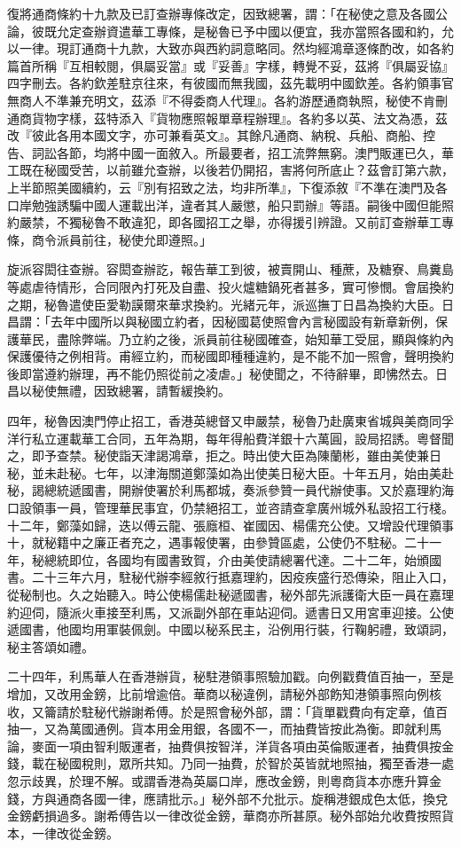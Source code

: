 \begin{pinyinscope}
復將通商條約十九款及已訂查辦專條改定，因致總署，謂：「在秘使之意及各國公論，彼既允定查辦資遣華工專條，是秘魯已予中國以便宜，我亦當照各國和約，允以一律。現訂通商十九款，大致亦與西約詞意略同。然均經鴻章逐條酌改，如各約篇首所稱『互相較閱，俱屬妥當』或『妥善』字樣，轉覺不妥，茲將『俱屬妥協』四字刪去。各約欽差駐京往來，有彼國而無我國，茲先載明中國欽差。各約領事官無商人不準兼充明文，茲添『不得委商人代理』。各約游歷通商執照，秘使不肯刪通商貨物字樣，茲特添入『貨物應照報單章程辦理』。各約多以英、法文為憑，茲改『彼此各用本國文字，亦可兼看英文』。其餘凡通商、納稅、兵船、商船、控告、詞訟各節，均將中國一面敘入。所最要者，招工流弊無窮。澳門販運已久，華工既在秘國受苦，以前雖允查辦，以後若仍開招，害將何所底止？茲會訂第六款，上半節照美國續約，云『別有招致之法，均非所準』，下復添敘『不準在澳門及各口岸勉強誘騙中國人運載出洋，違者其人嚴懲，船只罰辦』等語。嗣後中國但能照約嚴禁，不獨秘魯不敢違犯，即各國招工之舉，亦得援引辨證。又前訂查辦華工專條，商令派員前往，秘使允即遵照。」

旋派容閎往查辦。容閎查辦訖，報告華工到彼，被賣開山、種蔗，及糖寮、鳥糞島等處虐待情形，合同限內打死及自盡、投火爐糖鍋死者甚多，實可慘憫。會屆換約之期，秘魯遣使臣愛勒謨爾來華求換約。光緒元年，派巡撫丁日昌為換約大臣。日昌謂：「去年中國所以與秘國立約者，因秘國葛使照會內言秘國設有新章新例，保護華民，盡除弊端。乃立約之後，派員前往秘國確查，始知華工受屈，顯與條約內保護優待之例相背。甫經立約，而秘國即種種違約，是不能不加一照會，聲明換約後即當遵約辦理，再不能仍照從前之凌虐。」秘使聞之，不待辭畢，即怫然去。日昌以秘使無禮，因致總署，請暫緩換約。

四年，秘魯因澳門停止招工，香港英總督又申嚴禁，秘魯乃赴廣東省城與美商同孚洋行私立運載華工合同，五年為期，每年得船費洋銀十六萬圓，設局招誘。粵督聞之，即予查禁。秘使詣天津謁鴻章，拒之。時出使大臣為陳蘭彬，雖由美使兼日秘，並未赴秘。七年，以津海關道鄭藻如為出使美日秘大臣。十年五月，始由美赴秘，謁總統遞國書，開辦使署於利馬都城，奏派參贊一員代辦使事。又於嘉理約海口設領事一員，管理華民事宜，仍禁絕招工，並咨請查拿廣州城外私設招工行棧。十二年，鄭藻如歸，迭以傅云龍、張廕桓、崔國因、楊儒充公使。又增設代理領事十，就秘籍中之廉正者充之，遇事報使署，由參贊區處，公使仍不駐秘。二十一年，秘總統即位，各國均有國書致賀，介由美使請總署代達。二十二年，始頒國書。二十三年六月，駐秘代辦李經敘行抵嘉理約，因疫疾盛行恐傳染，阻止入口，從秘制也。久之始聽入。時公使楊儒赴秘遞國書，秘外部先派護衛大臣一員在嘉理約迎伺，隨派火車接至利馬，又派副外部在車站迎伺。遞書日又用宮車迎接。公使遞國書，他國均用軍裝佩劍。中國以秘系民主，沿例用行裝，行鞠躬禮，致頌詞，秘主答頌如禮。

二十四年，利馬華人在香港辦貨，秘駐港領事照驗加戳。向例戳費值百抽一，至是增加，又改用金鎊，比前增逾倍。華商以秘違例，請秘外部飭知港領事照向例核收，又籥請於駐秘代辦謝希傅。於是照會秘外部，謂：「貨單戳費向有定章，值百抽一，又為萬國通例。貨本用金用銀，各國不一，而抽費皆按此為衡。即就利馬論，麥面一項由智利販運者，抽費俱按智洋，洋貨各項由英倫販運者，抽費俱按金錢，載在秘國稅則，眾所共知。乃同一抽費，於智於英皆就地照抽，獨至香港一處忽示歧異，於理不解。或謂香港為英屬口岸，應改金鎊，則粵商貨本亦應升算金錢，方與通商各國一律，應請批示。」秘外部不允批示。旋稱港銀成色太低，換兌金鎊虧損過多。謝希傅告以一律改從金鎊，華商亦所甚原。秘外部始允收費按照貨本，一律改從金鎊。


\end{pinyinscope}
